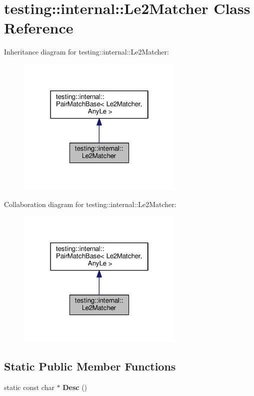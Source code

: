 \hypertarget{classtesting_1_1internal_1_1Le2Matcher}{}\section{testing\+:\+:internal\+:\+:Le2\+Matcher Class Reference}
\label{classtesting_1_1internal_1_1Le2Matcher}


Inheritance diagram for testing\+:\+:internal\+:\+:Le2\+Matcher\+:\nopagebreak
\begin{figure}[H]
\begin{center}
\leavevmode
\includegraphics[width=226pt]{classtesting_1_1internal_1_1Le2Matcher__inherit__graph}
\end{center}
\end{figure}


Collaboration diagram for testing\+:\+:internal\+:\+:Le2\+Matcher\+:\nopagebreak
\begin{figure}[H]
\begin{center}
\leavevmode
\includegraphics[width=226pt]{classtesting_1_1internal_1_1Le2Matcher__coll__graph}
\end{center}
\end{figure}
\subsection*{Static Public Member Functions}
\begin{DoxyCompactItemize}
\item 
static const char $\ast$ {\bfseries Desc} ()\hypertarget{classtesting_1_1internal_1_1Le2Matcher_a92e2aca3f09bb687895b10c272cb392f}{}\label{classtesting_1_1internal_1_1Le2Matcher_a92e2aca3f09bb687895b10c272cb392f}

\end{DoxyCompactItemize}
